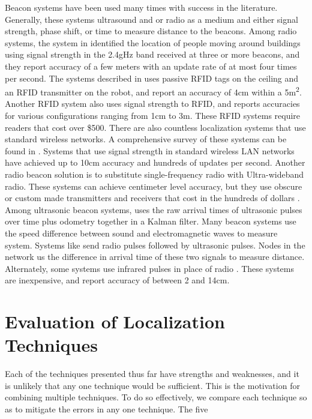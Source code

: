 \documentclass{article}
\begin{document}
Beacon systems have been used many times with success in the literature. Generally, these systems ultrasound and or radio as a medium and either signal strength, phase shift, or time to measure distance to the beacons. Among radio systems, the system in \cite{bahl_radar:_2000} identified the location of people moving around buildings using signal strength in the 2.4gHz band received at three or more beacons, and they report accuracy of a few meters with an update rate of at most four times per second. The systems described in \cite{digiampaolo_mobile_2014} uses passive RFID tags on the ceiling and an RFID transmitter on the robot, and report an accuracy of 4\si{\centi\meter} within a 5\si{\square\meter}. Another RFID system \cite{saab_standalone_2011} also uses signal strength to RFID, and reports accuracies for various configurations ranging from 1\si{\centi\meter} to 3\si{\meter}. These RFID systems require readers that cost over \$500. There are also countless localization systems that use standard wireless networks. A comprehensive survey of these systems can be found in \cite{liu_survey_2007}. Systems that use signal strength in standard wireless LAN networks have achieved up to 10\si{\centi\meter} accuracy and hundreds of updates per second. Another radio beacon solution is to substitute single-frequency radio with Ultra-wideband radio. These systems can achieve centimeter level accuracy, but they use obscure or custom made transmitters and receivers that cost in the hundreds of dollars \cite{noauthor_dart_nodate} \cite{noauthor_pozyx_nodate}. Among ultrasonic beacon systems, \cite{kleeman_optimal_1992} uses the raw arrival times of ultrasonic pulses over time plus odometry together in a Kalman filter. Many beacon systems use the speed difference between sound and electromagnetic waves to measure system. Systems like \cite{smith_tracking_2004} \cite{ward_new_1997} \cite{kim_advanced_2008} send radio pulses followed by ultrasonic pulses. Nodes in the network us the difference in arrival time of these two signals to measure distance. Alternately, some systems use infrared pulses in place of radio \cite{ghidary_new_1999} \cite{yucel_development_2012}. These systems are inexpensive, and report accuracy of between 2 and 14\si{\centi\meter}.

\section{Evaluation of Localization Techniques} \label{methods}

Each of the techniques presented thus far have strengths and weaknesses, and it is unlikely that any one technique would be sufficient. This is the motivation for combining multiple techniques. To do so effectively, we compare each technique so as to mitigate the errors in any one technique. The five
\end{document}
